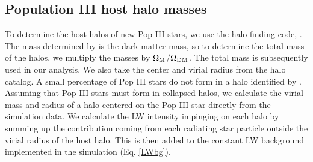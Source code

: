 \documentclass[a4paper,fleqn,usenatbib]{mnras}
\begin{document}
\subsection{Population III host halo masses}
 To determine the host halos of new Pop III stars, we use the halo finding code, \rockstar{} \citep{rockstar}. The mass determined by \rockstar{} is the dark matter mass, so to determine the total mass of the halos, we multiply the masses by $\Omega_{\rm M}$/$\Omega_{\rm DM}$. The total mass is subsequently used in our analysis. We also take the center and virial radius from the \rockstar{} halo catalog. A small percentage of Pop III stars do not form in a halo identified by \rockstar{}. Assuming that Pop III stars must form in collapsed halos, we calculate the virial mass and radius of a halo centered on the Pop III star directly from the simulation data. We calculate the LW intensity impinging on each halo by summing up the contribution coming from each radiating star particle outside the virial radius of the host halo. This is then added to the constant LW background implemented in the simulation (Eq. \ref{LWbg}). 
\end{document}
